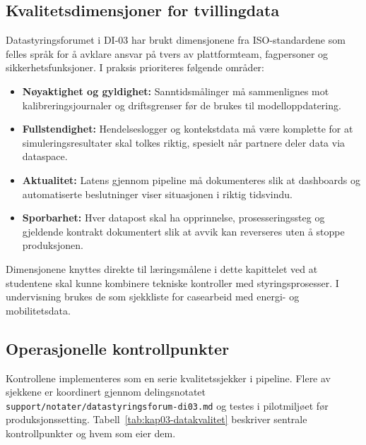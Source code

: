 \subsection{Kvalitetsdimensjoner for tvillingdata}
Datastyringsforumet i DI-03 har brukt dimensjonene fra ISO-standardene som felles språk for å avklare ansvar på tvers av plattformteam, fagpersoner og sikkerhetsfunksjoner. I praksis prioriteres følgende områder:
\begin{itemize}
    \item \textbf{Nøyaktighet og gyldighet:} Sanntidsmålinger må sammenlignes mot kalibreringsjournaler og driftsgrenser før de brukes til modelloppdatering.
    \item \textbf{Fullstendighet:} Hendelseslogger og kontekstdata må være komplette for at simuleringsresultater skal tolkes riktig, spesielt når partnere deler data via dataspace.
    \item \textbf{Aktualitet:} Latens gjennom pipeline må dokumenteres slik at dashboards og automatiserte beslutninger viser situasjonen i riktig tidsvindu.
    \item \textbf{Sporbarhet:} Hver datapost skal ha opprinnelse, prosesseringssteg og gjeldende kontrakt dokumentert slik at avvik kan reverseres uten å stoppe produksjonen.
\end{itemize}

Dimensjonene knyttes direkte til læringsmålene i dette kapittelet ved at studentene skal kunne kombinere tekniske kontroller med styringsprosesser. I undervisning brukes de som sjekkliste for casearbeid med energi- og mobilitetsdata.

\subsection{Operasjonelle kontrollpunkter}
Kontrollene implementeres som en serie kvalitetssjekker i pipeline. Flere av sjekkene er koordinert gjennom delingsnotatet \texttt{support/notater/datastyringsforum-di03.md} og testes i pilotmiljøet før produksjonssetting. Tabell~\ref{tab:kap03-datakvalitet} beskriver sentrale kontrollpunkter og hvem som eier dem.

